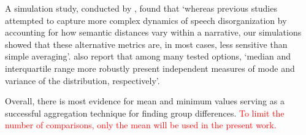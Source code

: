 A simulation study, conducted by \citet{fradkin2023theory}, found that `whereas previous studies attempted to capture more complex dynamics of speech disorganization by accounting for how semantic distances vary within a narrative, our simulations showed that these alternative metrics are, in most cases, less sensitive than simple averaging'. \citet{parola2022speech} also report that among many tested options, `median and interquartile range more robustly present independent measures of mode and variance of the distribution, respectively'.

Overall, there is most evidence for mean and minimum values serving as a successful aggregation technique for finding group differences. \textcolor{red}{To limit the number of comparisons, only the mean will be used in the present work.}



